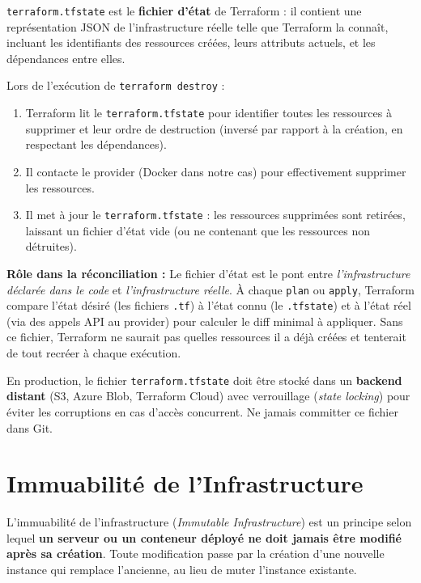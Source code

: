 \documentclass[12pt,a4paper]{report}
\begin{document}
\texttt{terraform.tfstate} est le \textbf{fichier d'état} de Terraform : il contient une
représentation JSON de l'infrastructure réelle telle que Terraform la connaît, incluant
les identifiants des ressources créées, leurs attributs actuels, et les dépendances
entre elles.

Lors de l'exécution de \texttt{terraform destroy} :

\begin{enumerate}
  \item Terraform lit le \texttt{terraform.tfstate} pour identifier toutes les ressources
        à supprimer et leur ordre de destruction (inversé par rapport à la création,
        en respectant les dépendances).
  \item Il contacte le provider (Docker dans notre cas) pour effectivement supprimer
        les ressources.
  \item Il met à jour le \texttt{terraform.tfstate} : les ressources supprimées sont
        retirées, laissant un fichier d'état vide (ou ne contenant que les ressources
        non détruites).
\end{enumerate}

\noindent\textbf{Rôle dans la réconciliation :} Le fichier d'état est le pont entre
\textit{l'infrastructure déclarée dans le code} et \textit{l'infrastructure réelle}.
À chaque \texttt{plan} ou \texttt{apply}, Terraform compare l'état désiré (les
fichiers \texttt{.tf}) à l'état connu (le \texttt{.tfstate}) et à l'état réel (via des
appels API au provider) pour calculer le diff minimal à appliquer. Sans ce fichier,
Terraform ne saurait pas quelles ressources il a déjà créées et tenterait de tout
recréer à chaque exécution.

\begin{tcolorbox}[colback=orange!5, colframe=orange!80!black, title=Attention en production]
  En production, le fichier \texttt{terraform.tfstate} doit être stocké dans un
  \textbf{backend distant} (S3, Azure Blob, Terraform Cloud) avec verrouillage
  (\textit{state locking}) pour éviter les corruptions en cas d'accès concurrent.
  Ne jamais committer ce fichier dans Git.
\end{tcolorbox}

\section{Immuabilité de l'Infrastructure}

L'immuabilité de l'infrastructure (\textit{Immutable Infrastructure}) est un principe
selon lequel \textbf{un serveur ou un conteneur déployé ne doit jamais être modifié
après sa création}. Toute modification passe par la création d'une nouvelle instance
qui remplace l'ancienne, au lieu de muter l'instance existante.
\end{document}
